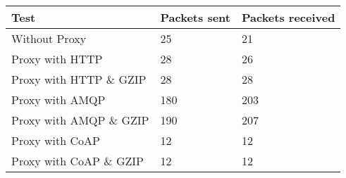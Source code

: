 \begin{tabular}{|l|l|l|}
\hline
\textbf{Test} & \textbf{Packets sent} & \textbf{Packets received} \\ \hline
Without Proxy                    &25         & 21        \\ \hline 
Proxy with HTTP                  &28         & 26        \\ \hline 
Proxy with HTTP \& GZIP          &28         & 28        \\ \hline 
Proxy with AMQP                  &180        & 203       \\ \hline 
Proxy with AMQP \& GZIP          &190        & 207       \\ \hline 
Proxy with CoAP                  &12         & 12        \\ \hline 
Proxy with CoAP \& GZIP          &12         & 12        \\ \hline 
\end{tabular}
